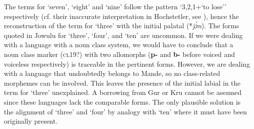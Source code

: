 \begin{table}[t]
\caption{\label{tab:3:201}Jowulu numerals}

\end{table}

The terms for ‘seven’, ‘eight’ and ‘nine’ follow the pattern ‘3,2,1+‘to lose’’ respectively (cf. their inaccurate interpretation in Hochstetler, see ), hence the reconstruction of the term for ‘three’ with the initial palatal (*\textit{j{\`{ɔ}}n}). The forms quoted in Jowulu for ‘three’, ‘four’, and ‘ten’ are uncommon. If we were dealing with a language with a noun class system, we would have to conclude that a noun class marker (\textsc{cl}19?) with two allomorphs (\textbf{p-} and \textbf{b-} before voiced and voiceless respectively) is traceable in the pertinent forms. However, we are dealing with a language that undoubtedly belongs to Mande, so no class-related morphemes can be involved. This leaves the presence of the initial labial in the term for ‘three’ unexplained. A borrowing from Gur or Kru cannot be assumed since these languages lack the comparable forms. The only plausible solution is the alignment of ‘three’ and ‘four’ by analogy with ‘ten’ where it must have been originally present.

